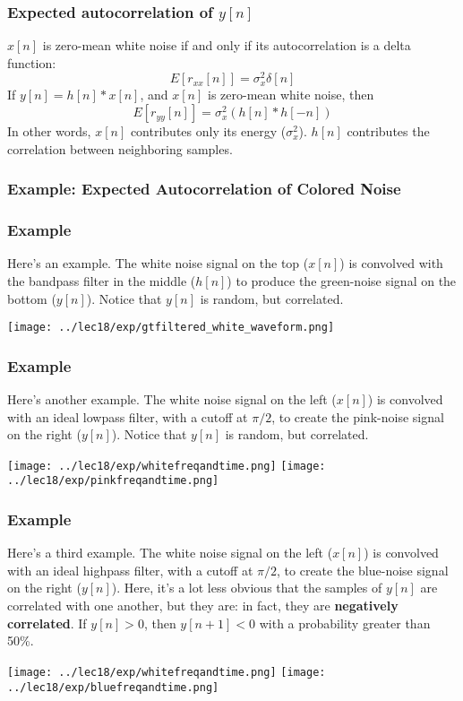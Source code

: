 \documentclass{beamer}
\begin{document}
\begin{frame}
  \frametitle{Expected autocorrelation of $y[n]$}
  
  $x[n]$ is zero-mean white noise if and  only if its autocorrelation is a delta function:
  \[
  E\left[r_{xx}[n]\right] = \sigma_x^2 \delta[n]
  \]
  If $y[n]=h[n]\ast x[n]$, and $x[n]$ is zero-mean white noise, then
  \[
  E\left[r_{yy}[n]\right] = \sigma_x^2 \left(h[n]\ast h[-n]\right)
  \]
  In other words, $x[n]$ contributes only its energy ($\sigma_x^2$).  $h[n]$ contributes the
  correlation between neighboring  samples.
\end{frame}

\begin{frame}
  \frametitle{Example: Expected Autocorrelation of Colored Noise}
  
  \centerline{}
\end{frame}

\begin{frame}
  \frametitle{Example}

  Here's an example.  The white noise signal on the top ($x[n]$) is
  convolved with the bandpass filter in the middle ($h[n]$) to produce
  the green-noise signal on the bottom ($y[n]$).  Notice that $y[n]$
  is random, but correlated.
  
  \centerline{\texttt{[image: ../lec18/exp/gtfiltered\_white\_waveform.png]}}
\end{frame}

\begin{frame}
  \frametitle{Example}

  Here's another example.  The white noise signal on the left ($x[n]$) is
  convolved with an ideal lowpass filter, with a cutoff at $\pi/2$, to create 
  the pink-noise signal on the right ($y[n]$).  Notice that $y[n]$
  is random, but correlated.
  
  \centerline{\texttt{[image: ../lec18/exp/whitefreqandtime.png]}
    \texttt{[image: ../lec18/exp/pinkfreqandtime.png]}}
\end{frame}

\begin{frame}
  \frametitle{Example}

  Here's a third example.  The white noise signal on the left ($x[n]$)
  is convolved with an ideal highpass filter, with a cutoff at
  $\pi/2$, to create the blue-noise signal on the right ($y[n]$).
  Here, it's a lot less obvious that the samples of $y[n]$ are
  correlated with one another, but they are: in fact, they are {\bf
    negatively correlated}.  If $y[n]>0$, then $y[n+1]<0$ with a
  probability greater than 50\%.
  
  \centerline{\texttt{[image: ../lec18/exp/whitefreqandtime.png]}
    \texttt{[image: ../lec18/exp/bluefreqandtime.png]}}
\end{frame}
\end{document}

